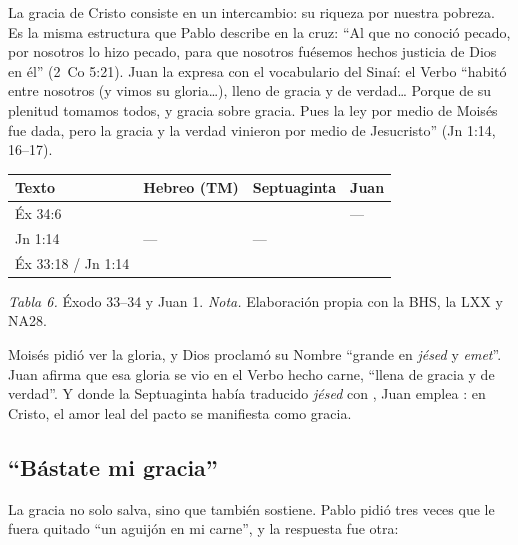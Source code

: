 La gracia de Cristo consiste en un intercambio: su riqueza por nuestra pobreza. Es la misma estructura que Pablo describe en la cruz: ``Al que no conoció pecado, por nosotros lo hizo pecado, para que nosotros fuésemos hechos justicia de Dios en él'' (2~Co 5:21). Juan la expresa con el vocabulario del Sinaí: el Verbo ``habitó entre nosotros (y vimos su gloria\ldots), lleno de gracia y de verdad\ldots{} Porque de su plenitud tomamos todos, y gracia sobre gracia. Pues la ley por medio de Moisés fue dada, pero la gracia y la verdad vinieron por medio de Jesucristo'' (Jn 1:14, 16--17).

\begin{center}\small\renewcommand{\arraystretch}{1.22}
\begin{tabular}{@{}L{2.6cm}L{4.6cm}L{3.6cm}L{3.6cm}@{}}
\toprule
\textbf{Texto} & \textbf{Hebreo (TM)} & \textbf{Septuaginta} & \textbf{Juan} \\ \midrule
Éx 34:6 &  &  & --- \\
Jn 1:14 & --- & --- &  \\
Éx 33:18 / Jn 1:14 &  &  &  \\
\bottomrule
\end{tabular}\par
{\footnotesize\color{gris}\textit{Tabla 6.} Éxodo 33--34 y Juan 1. \textit{Nota.} Elaboración propia con la BHS, la LXX y NA28.}
\end{center}

Moisés pidió ver la gloria, y Dios proclamó su Nombre ``grande en \emph{jésed} y \emph{emet}''. Juan afirma que esa gloria se vio en el Verbo hecho carne, ``llena de gracia y de verdad''. Y donde la Septuaginta había traducido \emph{jésed} con , Juan emplea : en Cristo, el amor leal del pacto se manifiesta como gracia.


\subsection{“Bástate mi gracia”}
La gracia no solo salva, sino que también sostiene. Pablo pidió tres veces que le fuera quitado ``un aguijón en mi carne'', y la respuesta fue otra:

